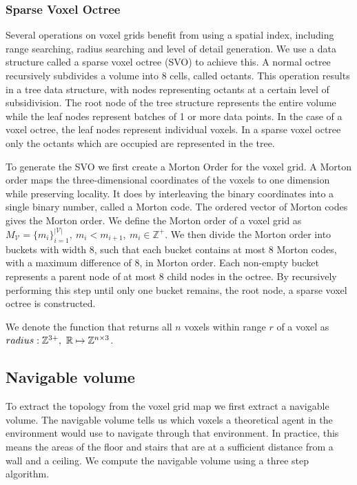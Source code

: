 \subsubsection{Sparse Voxel Octree}
Several operations on voxel grids benefit from using a spatial index, including range searching, radius searching and level of detail generation. We use a data structure called a sparse voxel octree (SVO) to achieve this. A normal octree recursively subdivides a volume into 8 cells, called octants. This operation results in a tree data structure, with nodes representing octants at a certain level of subsidivision. The root node of the tree structure represents the entire volume while the leaf nodes represent batches of 1 or more data points. In the case of a voxel octree, the leaf nodes represent individual voxels. In a sparse voxel octree only the octants which are occupied are represented in the tree. 

To generate the SVO we first create a Morton Order for the voxel grid. A Morton order maps the three-dimensional coordinates of the voxels to one dimension while preserving locality. It does by interleaving the binary coordinates into a single binary number, called a Morton code. The ordered vector of Morton codes gives the Morton order. We define the Morton order of a voxel grid as \(M_{\mathcal{V}}=\{m_i\}_{i=1}^{|\mathcal{V}|},\ m_i < m_{i+1},\ m_i \in \mathbb{Z^+}\). We then divide the Morton order into buckets with width 8, such that each bucket contains at most 8 Morton codes, with a maximum difference of 8, in Morton order. Each non-empty bucket represents a parent node of at most 8 child nodes in the octree. By recursively performing this step until only one bucket remains, the root node, a sparse voxel octree is constructed. 

We denote the function that returns all \(n\) voxels within range \(r\) of a voxel as \(radius: \mathbb{Z}^{3+},\ \mathbb{R} \mapsto \voxelset\).

\subsection{Navigable volume}
To extract the topology from the voxel grid map we first extract a navigable volume. The navigable volume tells us which voxels a theoretical agent in the environment would use to navigate through that environment. In practice, this means the areas of the floor and stairs that are at a sufficient distance from a wall and a ceiling. We compute the navigable volume using a three step algorithm.

